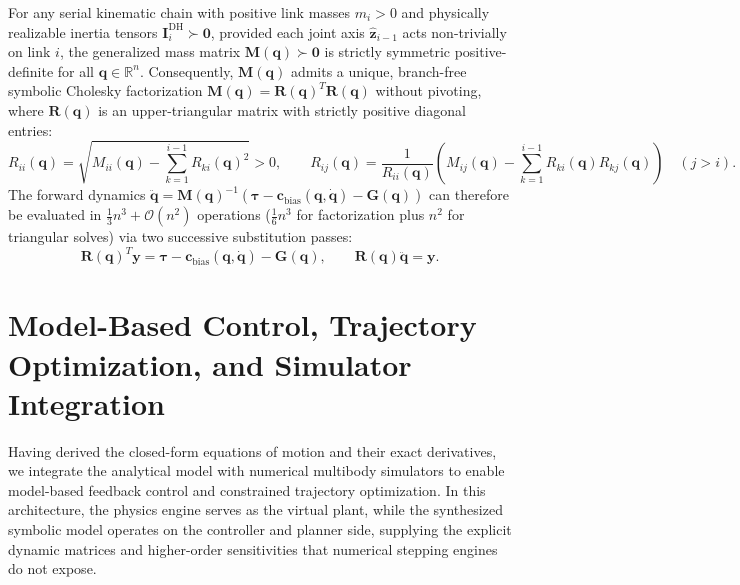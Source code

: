 \documentclass[fleqn,10pt]{article}
\begin{document}
	For any serial kinematic chain with positive link masses $m_i > 0$ and physically realizable inertia tensors $\bm{I}_i^{\mathrm{DH}} \succ \bm{0}$, provided each joint axis $\hat{\bm{z}}_{i-1}$ acts non-trivially on link $i$, the generalized mass matrix $\bm{M}(\bm{q}) \succ \bm{0}$ is strictly symmetric positive-definite for all $\bm{q} \in \mathbb{R}^n$. Consequently, $\bm{M}(\bm{q})$ admits a unique, branch-free symbolic Cholesky factorization $\bm{M}(\bm{q}) = \bm{R}(\bm{q})^T\bm{R}(\bm{q})$ without pivoting, where $\bm{R}(\bm{q})$ is an upper-triangular matrix with strictly positive diagonal entries:
	\begin{equation}
		R_{ii}(\bm{q}) = \sqrt{M_{ii}(\bm{q}) - \sum_{k=1}^{i-1} R_{ki}(\bm{q})^2} > 0, \qquad R_{ij}(\bm{q}) = \frac{1}{R_{ii}(\bm{q})}\left(M_{ij}(\bm{q}) - \sum_{k=1}^{i-1} R_{ki}(\bm{q})R_{kj}(\bm{q})\right) \quad (j > i).
		\label{eq:cholesky_factor}
	\end{equation}
	The forward dynamics $\ddot{\bm{q}} = \bm{M}(\bm{q})^{-1}(\bm{\tau} - \bm{c}_{\mathrm{bias}}(\bm{q},\dot{\bm{q}}) - \bm{G}(\bm{q}))$ can therefore be evaluated in $\frac{1}{3}n^3 + \mathcal{O}(n^2)$ operations ($\frac{1}{6}n^3$ for factorization plus $n^2$ for triangular solves) via two successive substitution passes:
	\begin{equation}
		\bm{R}(\bm{q})^T \bm{y} = \bm{\tau} - \bm{c}_{\mathrm{bias}}(\bm{q},\dot{\bm{q}}) - \bm{G}(\bm{q}), \qquad \bm{R}(\bm{q})\ddot{\bm{q}} = \bm{y}.
		\label{eq:cholesky_solve}
	\end{equation}

\section{Model-Based Control, Trajectory Optimization, and Simulator Integration} \label{sec:control_arch}

Having derived the closed-form equations of motion and their exact derivatives, we integrate the analytical model with numerical multibody simulators to enable model-based feedback control and constrained trajectory optimization. In this architecture, the physics engine serves as the virtual plant, while the synthesized symbolic model operates on the controller and planner side, supplying the explicit dynamic matrices and higher-order sensitivities that numerical stepping engines do not expose.
\end{document}
